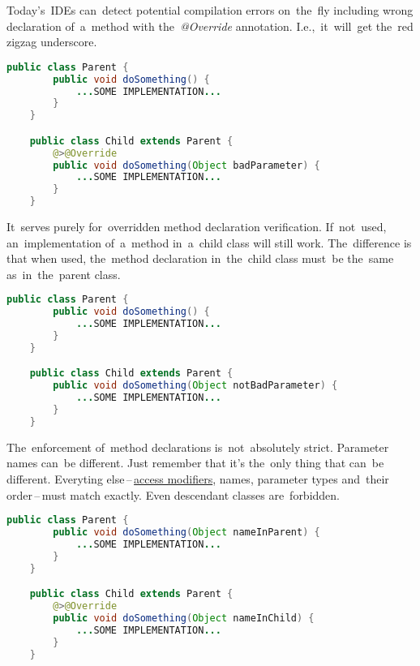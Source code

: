 \note Today's~IDEs can~detect potential compilation errors on~the~fly including wrong declaration of~a~method with the~\textit{@Override} annotation. I.e.,~it~will~get the~red zigzag underscore.

\begin{lstlisting}[language=Java]
    public class Parent {
        public void doSomething() {
            ...SOME IMPLEMENTATION...
        }
    }

    public class Child extends Parent {
        @>@Override
        public void doSomething(Object badParameter) {
            ...SOME IMPLEMENTATION...
        }
    }
\end{lstlisting}

\warning It~serves purely for~overridden method declaration verification. If~not~used, an~implementation of~a~method in~a~child class will still work. The~difference is that when used, the~method declaration in~the~child class must~be the~same as~in~the~parent class.

\begin{lstlisting}[language=Java]
    public class Parent {
        public void doSomething() {
            ...SOME IMPLEMENTATION...
        }
    }

    public class Child extends Parent {
        public void doSomething(Object notBadParameter) {
            ...SOME IMPLEMENTATION...
        }
    }
\end{lstlisting}

\warning The~enforcement of~method declarations is~not~absolutely strict. Parameter names can~be different. Just remember that it's the~only thing that can~be different. Everyting else\,--\,\hyperref[javaaccessmodifiers]{access modifiers}, names, parameter types and~their order\,--\,must match exactly. Even descendant classes are~forbidden.

\begin{lstlisting}[language=Java]
    public class Parent {
        public void doSomething(Object nameInParent) {
            ...SOME IMPLEMENTATION...
        }
    }

    public class Child extends Parent {
        @>@Override
        public void doSomething(Object nameInChild) {
            ...SOME IMPLEMENTATION...
        }
    }
\end{lstlisting}

